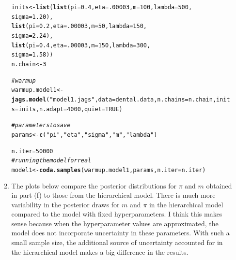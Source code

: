 \documentclass[12pt]{article}\usepackage[]{graphicx}\usepackage[]{color}
\makeatletter
\newcommand{\hlnum}[1]{\textcolor[rgb]{0.686,0.059,0.569}{#1}}%
\newcommand{\hlstr}[1]{\textcolor[rgb]{0.192,0.494,0.8}{#1}}%
\newcommand{\hlcom}[1]{\textcolor[rgb]{0.678,0.584,0.686}{\textit{#1}}}%
\newcommand{\hlstd}[1]{\textcolor[rgb]{0.345,0.345,0.345}{#1}}%
\newcommand{\hlkwb}[1]{\textcolor[rgb]{0.69,0.353,0.396}{#1}}%
\newcommand{\hlkwc}[1]{\textcolor[rgb]{0.333,0.667,0.333}{#1}}%
\newcommand{\hlkwd}[1]{\textcolor[rgb]{0.737,0.353,0.396}{\textbf{#1}}}%
\newenvironment{kframe}{%
 \def\at@end@of@kframe{}%
 \ifinner\ifhmode%
  \def\at@end@of@kframe{\end{minipage}}%
  \begin{minipage}{\columnwidth}%
 \fi\fi%
 \def\FrameCommand##1{\hskip\@totalleftmargin \hskip-\fboxsep
 \colorbox{shadecolor}{##1}\hskip-\fboxsep
     \hskip-\linewidth \hskip-\@totalleftmargin \hskip\columnwidth}%
 \MakeFramed {\advance\hsize-\width
   \@totalleftmargin\z@ \linewidth\hsize
   \@setminipage}}%
 {\par\unskip\endMakeFramed%
 \at@end@of@kframe}
\newenvironment{knitrout}{}{} %
\makeatother
\begin{document}
\begin{enumerate}
\begin{enumerate}
\begin{knitrout}
\begin{kframe}
\begin{alltt}
\hlstd{inits} \hlkwb{<-} \hlkwd{list}\hlstd{(}\hlkwd{list}\hlstd{(}\hlkwc{pi}\hlstd{=}\hlnum{0.4}\hlstd{,} \hlkwc{eta} \hlstd{=} \hlnum{.00003}\hlstd{,} \hlkwc{m} \hlstd{=} \hlnum{100}\hlstd{,} \hlkwc{lambda} \hlstd{=} \hlnum{500}\hlstd{,}
                   \hlkwc{sigma} \hlstd{=} \hlnum{1.20}\hlstd{),}
              \hlkwd{list}\hlstd{(}\hlkwc{pi}\hlstd{=}\hlnum{0.2}\hlstd{,} \hlkwc{eta} \hlstd{=} \hlnum{.00003}\hlstd{,} \hlkwc{m} \hlstd{=} \hlnum{50}\hlstd{,} \hlkwc{lambda} \hlstd{=} \hlnum{150}\hlstd{,}
                   \hlkwc{sigma} \hlstd{=} \hlnum{2.24}\hlstd{),}
              \hlkwd{list}\hlstd{(}\hlkwc{pi}\hlstd{=}\hlnum{0.4}\hlstd{,} \hlkwc{eta} \hlstd{=} \hlnum{.00003}\hlstd{,} \hlkwc{m} \hlstd{=} \hlnum{150}\hlstd{,} \hlkwc{lambda} \hlstd{=} \hlnum{300}\hlstd{,}
                   \hlkwc{sigma} \hlstd{=} \hlnum{1.58}\hlstd{))}
\hlstd{n.chain} \hlkwb{<-} \hlnum{3}

\hlcom{#warmup}
\hlstd{warmup.model1} \hlkwb{<-} \hlkwd{jags.model}\hlstd{(}\hlstr{"model1.jags"}\hlstd{,} \hlkwc{data}\hlstd{=dental.data,} \hlkwc{n.chains}\hlstd{=n.chain,} \hlkwc{inits}\hlstd{= inits,} \hlkwc{n.adapt}\hlstd{=}\hlnum{4000}\hlstd{,} \hlkwc{quiet}\hlstd{=}\hlnum{TRUE}\hlstd{)}

\hlcom{#parameters to save}
\hlstd{params} \hlkwb{<-} \hlkwd{c}\hlstd{(}\hlstr{"pi"}\hlstd{,} \hlstr{"eta"}\hlstd{,} \hlstr{"sigma"}\hlstd{,} \hlstr{"m"}\hlstd{,} \hlstr{"lambda"}\hlstd{)}

\hlstd{n.iter}\hlkwb{=}\hlnum{50000}
\hlcom{#running the model for real}
\hlstd{model1} \hlkwb{<-} \hlkwd{coda.samples}\hlstd{(warmup.model1, params,} \hlkwc{n.iter}\hlstd{=n.iter)}
\end{alltt}
\end{kframe}
\end{knitrout}

\item The plots below compare the posterior distributions for $\pi$ and $m$ obtained in part (f) to those from the hierarchical model. There is much more variability in the posterior draws for $m$ and $\pi$ in the hierarchical model compared to the model with fixed hyperparameters. I think this makes sense because when the hyperparameter values are approximated, the model does not incorporate uncertainty in these parameters. With such a small sample size, the additional source of uncertainty accounted for in the hierarchical model makes a big difference in the results.


\end{enumerate}
\end{enumerate}
\end{document}

